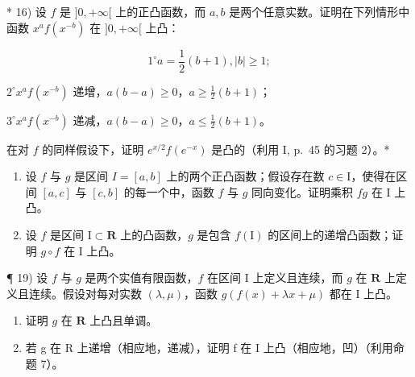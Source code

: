 * 16) 设 \(f\) 是 \(]0, +\infty[\) 上的正凸函数，而 \(a, b\) 是两个任意实数。证明在下列情形中函数 \(x^a f(x^{-b})\) 在 \(]0, +\infty[\) 上凸：

\[
1 ^ {\circ} a = \frac {1}{2} (b + 1), | b | \geqslant 1;
\]

\(2^{\circ} x^{a} f(x^{-b})\) 递增，\(a(b - a) \geqslant 0\)，\(a \geqslant \frac{1}{2}(b + 1)\)；

\(3^{\circ} x^{a} f(x^{-b})\) 递减，\(a(b-a) \geqslant 0\)，\(a \leqslant \frac{1}{2}(b+1)\)。

在对 \(f\) 的同样假设下，证明 \(e^{x / 2}f(e^{-x})\) 是凸的（利用 I, p.~45 的习题 2）。*

\begin{enumerate}
\def\labelenumi{\arabic{enumi})}
\setcounter{enumi}{16}
\item
  设 \(f\) 与 \(g\) 是区间 \(I = [a, b]\) 上的两个正凸函数；假设存在数 \(c \in \mathrm{I}\)，使得在区间 \([a, c]\) 与 \([c, b]\) 的每一个中，函数 \(f\) 与 \(g\) 同向变化。证明乘积 \(fg\) 在 \(\mathrm{I}\) 上凸。
\item
  设 \(f\) 是区间 \(\mathrm{I} \subset \mathbf{R}\) 上的凸函数，\(g\) 是包含 \(f(\mathrm{I})\) 的区间上的递增凸函数；证明 \(g \circ f\) 在 \(\mathrm{I}\) 上凸。
\end{enumerate}

¶ 19) 设 \(f\) 与 \(g\) 是两个实值有限函数，\(f\) 在区间 I 上定义且连续，而 \(g\) 在 \(\mathbf{R}\) 上定义且连续。假设对每对实数 \((\lambda, \mu)\)，函数 \(g(f(x) + \lambda x + \mu)\) 都在 I 上凸。

\begin{enumerate}
\def\labelenumi{\alph{enumi})}
\item
  证明 \(g\) 在 \(\mathbf{R}\) 上凸且单调。
\item
  若 g 在 R 上递增（相应地，递减），证明 f 在 I 上凸（相应地，凹）（利用命题 7）。
\end{enumerate}

